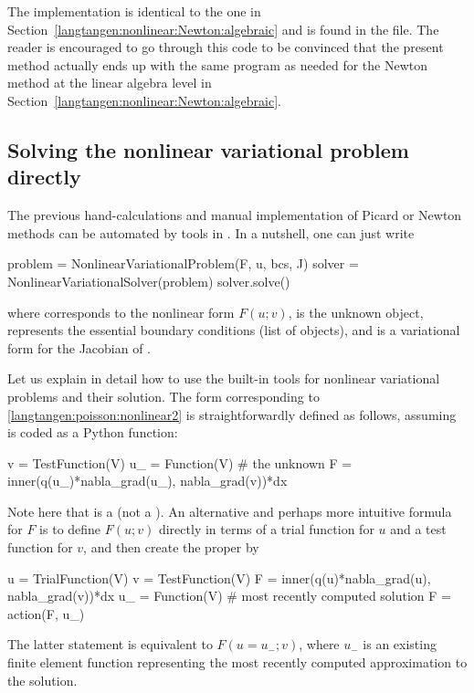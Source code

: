 The implementation is identical to the one in
Section~\ref{langtangen:nonlinear:Newton:algebraic} and is found in
the file\break {}. The reader is encouraged to go
through this code to be convinced that the present method actually
ends up with the same program as needed for the Newton method at
the linear algebra level in Section~\ref{langtangen:nonlinear:Newton:algebraic}.


\subsection{Solving the nonlinear variational problem directly}
\label{langtangen:nonlinear:Newton:auto}

The previous hand-calculations and manual implementation of
Picard or Newton methods can be automated by tools in \fenics.
In a nutshell, one can just write
\begin{python}
problem = NonlinearVariationalProblem(F, u, bcs, J)
solver  = NonlinearVariationalSolver(problem)
solver.solve()
\end{python}
where  corresponds to the nonlinear form $F(u;v)$,
 is the unknown  object, 
represents the essential boundary conditions (list of
 objects), and
 is a variational form for the Jacobian of .

Let us explain in detail how to use the built-in tools for
nonlinear variational problems and their solution.
The  form corresponding to \eqref{langtangen:poisson:nonlinear2}
is straightforwardly defined as follows, assuming  is
coded as a Python function:
\begin{python}
v  = TestFunction(V)
u_ = Function(V)  # the unknown
F  = inner(q(u_)*nabla_grad(u_), nabla_grad(v))*dx
\end{python}
Note here that  is a  (not a ).
An alternative and perhaps more intuitive formula for $F$ is to
define $F(u;v)$ directly in terms of
a trial function for $u$ and a test function for $v$, and then
create the proper  by
\begin{python}
u  = TrialFunction(V)
v  = TestFunction(V)
F  = inner(q(u)*nabla_grad(u), nabla_grad(v))*dx
u_ = Function(V)  # most recently computed solution
F  = action(F, u_)
\end{python}
The latter statement is equivalent to $F(u=u_{-}; v)$, where $u_{-}$ is
an existing finite element function representing the most recently
computed approximation to the solution.

